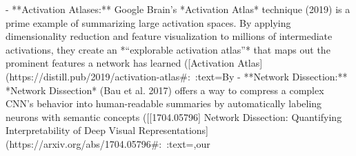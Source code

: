 - **Activation Atlases:** Google Brain’s *Activation Atlas* technique (2019) is a prime example of summarizing large activation spaces. By applying dimensionality reduction and feature visualization to millions of intermediate activations, they create an *“explorable activation atlas”* that maps out the prominent features a network has learned ([Activation Atlas](https://distill.pub/2019/activation-atlas#:~:text=By%
- **Network Dissection:** *Network Dissection* (Bau et al. 2017) offers a way to compress a complex CNN’s behavior into human-readable summaries by automatically labeling neurons with semantic concepts ([[1704.05796] Network Dissection: Quantifying Interpretability of Deep Visual Representations](https://arxiv.org/abs/1704.05796#:~:text=,our%

